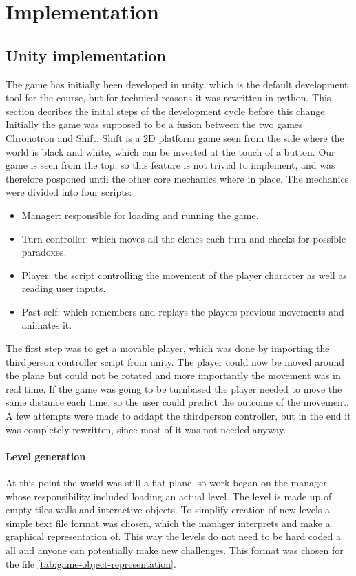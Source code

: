 \section{Implementation}
\subsection{Unity implementation}
The game has initially been developed in unity, which is the default development tool for the course, but for technical reasons it was rewritten in python. This section decribes the inital steps of the development cycle before this change.
Initially the game was supposed to be a fusion between the two games Chronotron and Shift. Shift is a 2D platform game seen from the side where the world is black and white, which can be inverted at the touch of a button. Our game is seen from the top, so this feature is not trivial to implement, and was therefore posponed until the other core mechanics where in place.
The mechanics were divided into four scripts:\\

\begin{itemize}
\item Manager: responsible for loading and running the game.
\item Turn controller: which moves all the clones each turn and checks for possible paradoxes.
\item Player: the script controlling the movement of the player character as well as reading user inputs.
\item Past self: which remembers and replays the players previous movements and animates it.
\end{itemize}

The first step was to get a movable player, which was done by importing the thirdperson controller script from unity. The player could now be moved around the plane but could not be rotated and more importantly the movement was in real time. If the game was going to be turnbased the player needed to move the same distance each time, so the user could predict the outcome of the movement. A few attempts were made to addapt the thirdperson controller, but in the end it was completely rewritten, since most of it was not needed anyway.

\paragraph {Level generation} At this point the world was still a flat plane, so work began on the manager whose responsibility included loading an actual level. The level is made up of empty tiles walls and interactive objects. To simplify creation of new levels a simple text file format was chosen, which the manager interprets and make a graphical representation of. This way the levels do not need to be hard coded a all and anyone can potentially make new challenges. This format was chosen for the file \ref{tab:game-object-representation}.

